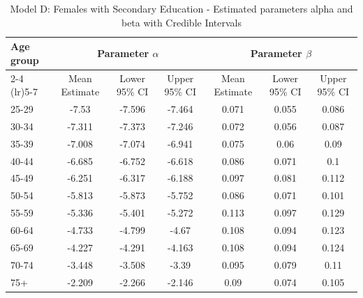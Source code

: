 \begin{landscape}
\begin{table}[htbp]
\centering
\caption{Model D: Females with Secondary Education - Estimated parameters alpha and beta  with Credible Intervals}
\label{tab:parameters_ab27}
\begin{tabular}{@{}lcccccc@{}}
\toprule
Age group & \multicolumn{3}{c}{Parameter \(\alpha\)} & \multicolumn{3}{c}{Parameter \(\beta\)} \\ 
\cmidrule(lr){2-4} \cmidrule(lr){5-7}
          & Mean Estimate & Lower 95\% CI & Upper 95\% CI & Mean Estimate & Lower 95\% CI & Upper 95\% CI \\ 
\midrule
25-29 & -7.53 & -7.596 & -7.464 & 0.071 & 0.055 & 0.086 \\
30-34 & -7.311 & -7.373 & -7.246 & 0.072 & 0.056 & 0.087 \\
35-39 & -7.008 & -7.074 & -6.941 & 0.075 & 0.06 & 0.09 \\
40-44 & -6.685 & -6.752 & -6.618 & 0.086 & 0.071 & 0.1 \\
45-49 & -6.251 & -6.317 & -6.188 & 0.097 & 0.081 & 0.112 \\
50-54 & -5.813 & -5.873 & -5.752 & 0.086 & 0.071 & 0.101 \\
55-59 & -5.336 & -5.401 & -5.272 & 0.113 & 0.097 & 0.129 \\
60-64 & -4.733 & -4.799 & -4.67 & 0.108 & 0.094 & 0.123 \\
65-69 & -4.227 & -4.291 & -4.163 & 0.108 & 0.094 & 0.124 \\
70-74 & -3.448 & -3.508 & -3.39 & 0.095 & 0.079 & 0.11 \\
75+ & -2.209 & -2.266 & -2.146 & 0.09 & 0.074 & 0.105 \\
\bottomrule
\end{tabular}
\end{table}
\end{landscape}